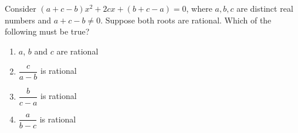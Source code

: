Consider $(a+c-b)x^2+2cx+(b+c-a)=0$, where $a,b,c$ are distinct real numbers and $a+c-b\ne0$. Suppose both roots are rational. Which of the following must be true?
\begin{enumerate}
\item[(A)] $a$, $b$ and $c$ are rational
\item[(B)] $\dfrac{c}{a-b}$ is rational
\item[(C)] $\dfrac{b}{c-a}$ is rational
\item[(D)] $\dfrac{a}{b-c}$ is rational
\end{enumerate}
